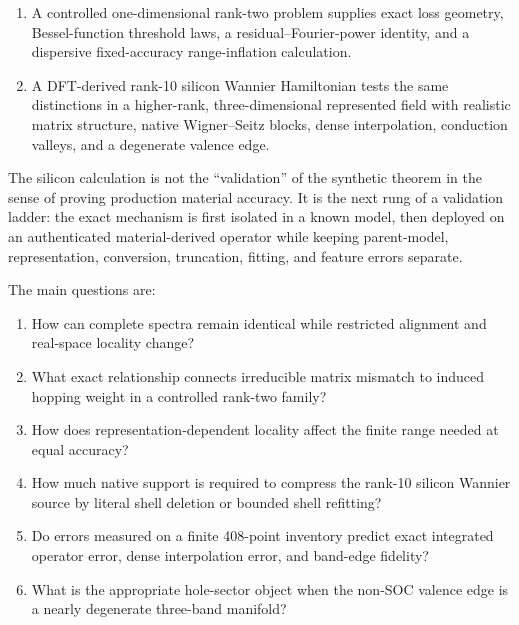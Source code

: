 \documentclass[11pt]{article}
\theoremstyle{definition}
\begin{document}
\begin{enumerate}[leftmargin=2em]
 \item A controlled one-dimensional rank-two problem supplies exact loss geometry,
 Bessel-function threshold laws, a residual--Fourier-power identity, and a dispersive
 fixed-accuracy range-inflation calculation.
 \item A DFT-derived rank-10 silicon Wannier Hamiltonian tests the same distinctions in
 a higher-rank, three-dimensional represented field with realistic matrix structure,
 native Wigner--Seitz blocks, dense interpolation, conduction valleys, and a degenerate
 valence edge.
\end{enumerate}

The silicon calculation is not the ``validation'' of the synthetic theorem in the sense
of proving production material accuracy.  It is the next rung of a validation ladder:
the exact mechanism is first isolated in a known model, then deployed on an authenticated
material-derived operator while keeping parent-model, representation, conversion,
truncation, fitting, and feature errors separate.

The main questions are:

\begin{enumerate}[leftmargin=2em]
 \item How can complete spectra remain identical while restricted alignment and
 real-space locality change?
 \item What exact relationship connects irreducible matrix mismatch to induced hopping
 weight in a controlled rank-two family?
 \item How does representation-dependent locality affect the finite range needed at
 equal accuracy?
 \item How much native support is required to compress the rank-10 silicon Wannier
 source by literal shell deletion or bounded shell refitting?
 \item Do errors measured on a finite 408-point inventory predict exact integrated
 operator error, dense interpolation error, and band-edge fidelity?
 \item What is the appropriate hole-sector object when the non-SOC valence edge is a
 nearly degenerate three-band manifold?
\end{enumerate}
\end{document}
